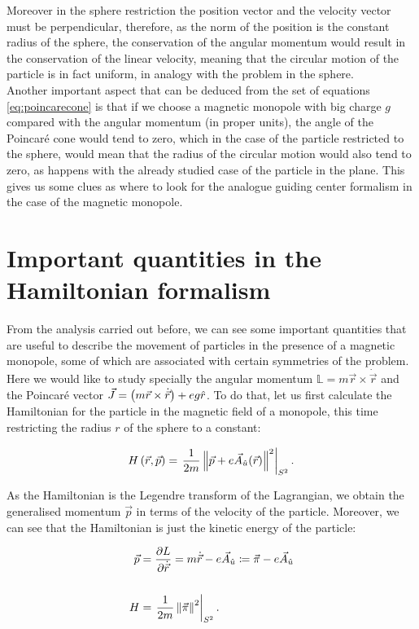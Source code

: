 Moreover in the sphere restriction the position vector and the velocity vector must be perpendicular, therefore, as the norm of the position is the constant radius of the sphere, the conservation of the angular momentum would result in the conservation of the linear velocity, meaning that the circular motion of the particle is in fact uniform, in analogy with the problem in the sphere.\\

Another important aspect that can be deduced from the set of equations \eqref{eq:poincarecone} is that if we choose a magnetic monopole with big charge $g$ compared with the angular momentum (in proper units), the angle of the Poincar\'e cone would tend to zero, which in the case of the particle restricted to the sphere, would mean that the radius of the circular motion would also tend to zero, as happens with the already studied case of the particle in the plane. This gives us some clues as where to look for the analogue guiding center formalism in the case of the magnetic monopole.\\

\section{Important quantities in the Hamiltonian formalism}
From the analysis carried out before, we can see some important quantities that are useful to describe the movement of particles in the presence of a magnetic monopole, some of which are associated with certain symmetries of the problem. Here we would like to study specially the angular momentum $\mathbb{L}= m\vec{r}\times\dot{\vec{r}}$ and the Poincar\'e vector $\vec{J} = \left( m\vec{r}\times\dot{\vec{r}} \right)+ eg\hat{r}$. To do that, let us first calculate the Hamiltonian for the particle in the magnetic field of a monopole, this time restricting the radius $r$ of the sphere to a constant:

\begin{equation}
H\left( \vec{r},\vec{p} \right) = \left.\frac{1}{2m}\left\lVert \vec{p}+e\vec{A}_{\hat{u}}(\vec{r}) \right\rVert^2\right|_{S^2}.
\label{eq:hamiltonian}
\end{equation}

As the Hamiltonian is the Legendre transform of the Lagrangian, we obtain the generalised momentum $\vec{p}$  in terms of the velocity of the particle. Moreover, we can see that the Hamiltonian is just the kinetic energy of the particle:

\begin{equation*}
\begin{aligned}
\vec{p} &= \frac{\partial L}{\partial \dot{\vec{r}}} = m\dot{\vec{r}}-e\vec{A}_{\hat{u}} \coloneqq \vec{\pi}-e\vec{A}_{\hat{u}} \\
\\
H &= \left.\frac{1}{2m}\left\lVert \vec{\pi} \right\rVert^2\right|_{S^2}.
\end{aligned}
\end{equation*}

